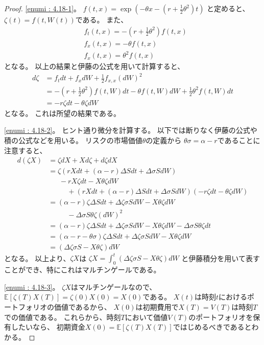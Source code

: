 \documentclass[uplatex]{jsarticle}
\theoremstyle{definition}
\def\E{\mathbb{E}}
\begin{document}
\begin{proof}
  \ref{enumi : 4.18-1}。
  \(f(t,x) = \exp \left(
  -\theta x - \left( r + \frac{1}{2}\theta^2\right) t \right)\)
  と定めると、\(\zeta(t) = f(t,W(t))\)である。
  また、
  \begin{align*}
    &f_t(t,x) = - \left( r + \frac{1}{2}\theta^2\right) f(t,x) \\
    &f_x(t,x) = - \theta f(t,x) \\
    &f_x(t,x) = \theta ^2 f(t,x)
  \end{align*}
  となる。
  以上の結果と伊藤の公式を用いて計算すると、
  \begin{align*}
    d\zeta &= f_tdt + f_xdW + \frac{1}{2}f_{x,x}(dW)^2 \\
    &= - \left( r + \frac{1}{2}\theta^2\right) f(t,W)dt
    - \theta f(t,W)dW + \frac{1}{2}\theta ^2 f(t,W) dt \\
    &= - r\zeta dt - \theta \zeta dW
  \end{align*}
  となる。
  これは所望の結果である。

  \ref{enumi : 4.18-2}。
  ヒント通り微分を計算する。
  以下では断りなく伊藤の公式や積の公式などを用いる。
  リスクの市場価値\(\theta\)の定義から
  \(\theta \sigma = \alpha - r\)であることに注意すると、
  \begin{align*}
    d(\zeta X) &= \zeta dX + X d\zeta + d\zeta dX \\
    &= \zeta \left( rXdt + (\alpha-r)\Delta S dt + \Delta\sigma SdW
    \right) \\
    &\ \ \ \ \ \ \
    - rX\zeta dt - X \theta \zeta dW \\
    &\ \ \ \ \ \ \ \ \ \ \ \
    + \left( rXdt + (\alpha-r)\Delta S dt + \Delta\sigma SdW \right)
    \left( - r\zeta dt - \theta \zeta dW \right) \\
    &= (\alpha-r)\zeta \Delta S dt + \Delta\zeta \sigma SdW
    - X \theta \zeta dW \\
    &\ \ \ \ \ \ \ \ \ \ \ \
    - \Delta\sigma S \theta \zeta (dW)^2 \\
    &= (\alpha-r)\zeta \Delta S dt + \Delta\zeta \sigma SdW
    - X \theta \zeta dW
    - \Delta\sigma S \theta \zeta dt \\
    &= ( \alpha - r - \theta \sigma )\zeta \Delta S dt
    + \Delta\zeta \sigma SdW - X \theta \zeta dW \\
    &= (\Delta\zeta \sigma S - X \theta \zeta )dW
  \end{align*}
  となる。
  以上より、\(\zeta X\)は
  \(\zeta X = \int_0^t(\Delta\zeta \sigma S - X \theta \zeta )dW\)
  と伊藤積分を用いて表すことができ、特にこれはマルチンゲールである。

  \ref{enumi : 4.18-3}。
  \(\zeta X\)はマルチンゲールなので、
  \(\E[\zeta(T)X(T)] = \zeta(0)X(0) = X(0)\)である。
  \(X(t)\)は時刻\(t\)におけるポートフォリオの価値であるから、
  \(X(0)\)は初期費用で\(X(T) = V(T)\)は時刻\(T\)での価値である。
  これらから、時刻\(T\)において価値\(V(T)\)のポートフォリオを保有したいなら、
  初期資金\(X(0) = \E[\zeta(T)X(T)]\)ではじめるべきであるとわかる。
\end{proof}
\end{document}
